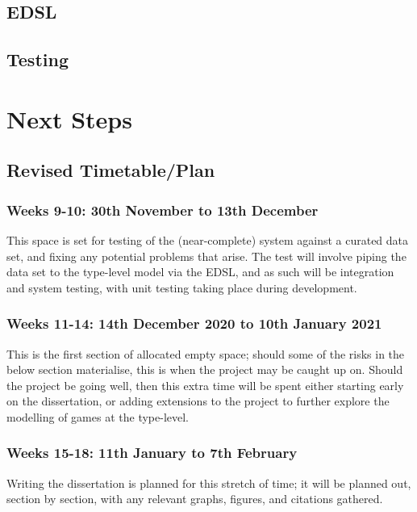 \documentclass[12pt, a4paper]{scrartcl}
\begin{document}
\subsection{EDSL}

\subsection{Testing}


\section{Next Steps}


\subsection{Revised Timetable/Plan}

\subsubsection{Weeks 9-10: 30th November to 13th December}

This space is set for testing of the (near-complete) system against a curated data set, and fixing any potential problems that arise. The test will involve piping the data set to the type-level model via the EDSL, and as such will be integration and system testing, with unit testing taking place during development.

\subsubsection{Weeks 11-14: 14th December 2020 to 10th January 2021}

This is the first section of allocated empty space; should some of the risks in the below section materialise, this is when the project may be caught up on. Should the project be going well, then this extra time will be spent either starting early on the dissertation, or adding extensions to the project to further explore the modelling of games at the type-level.

\subsubsection{Weeks 15-18: 11th January to 7th February}

Writing the dissertation is planned for this stretch of time; it will be planned out, section by section, with any relevant graphs, figures, and citations gathered.
\end{document}
